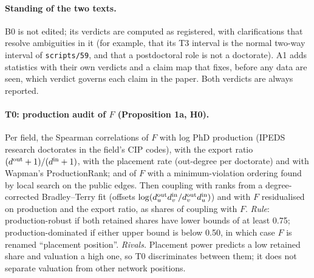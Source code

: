 \paragraph{Standing of the two texts.} B0 is not edited; its verdicts are computed as registered, with
clarifications that resolve ambiguities in it (for example, that its T3 interval is the normal two-way interval of
\texttt{scripts/59}, and that a postdoctoral role is not a doctorate). A1 adds statistics with their own verdicts
and a claim map that fixes, before any data are seen, which verdict governs each claim in the paper. Both verdicts
are always reported.

\paragraph{T0: production audit of $F$ (Proposition 1a, H0).} Per field, the Spearman correlations of $F$ with
log PhD production (IPEDS research doctorates in the field's CIP codes), with the export ratio
$(d^{\rm out}+1)/(d^{\rm in}+1)$, with the placement rate (out-degree per doctorate) and with Wapman's
ProductionRank; and of $F$ with a minimum-violation ordering found by local search on the public edges. Then
coupling with ranks from a degree-corrected Bradley--Terry fit (offsets $\log(d^{\rm out}_ud^{\rm in}_v/
d^{\rm out}_vd^{\rm in}_u)$) and with $F$ residualised on production and the export ratio, as shares of coupling
with $F$. \emph{Rule}: production-robust if both retained shares have lower bounds of at least 0.75;
production-dominated if either upper bound is below 0.50, in which case $F$ is renamed ``placement position''.
\emph{Rivals.} Placement power predicts a low retained share and valuation a high one, so T0 discriminates between
them; it does not separate valuation from other network positions.

